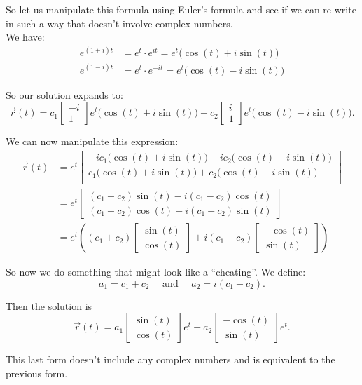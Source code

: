 \begin{example}
So let us manipulate this formula using Euler's formula and see if we can re-write in such a way that doesn't involve complex numbers. \\

We have:
\begin{align*}
	e^{(1+i)t} &= e^t \cdot e^{it} = e^t \big( \cos(t) + i \sin(t)\big) \\
	e^{(1-i)t} &= e^t \cdot e^{-it} = e^t \big( \cos(t) - i \sin(t)\big)
\end{align*}

So our solution expands to:
$$
\vec{r}(t) = c_1 \begin{bmatrix} -i \\ 1 \end{bmatrix} e^t \big( \cos(t) + i \sin(t)\big)
+c_2\begin{bmatrix} i \\ 1 \end{bmatrix} e^t \big( \cos(t) - i \sin(t)\big).
$$

We can now manipulate this expression:
\begin{align*}
\vec{r}(t) 
	& = e^t
		\begin{bmatrix}
			-i c_1 	\big( \cos(t) + i \sin(t)\big) + i c_2 \big( \cos(t) - i \sin(t)\big) \\
			c_1 	\big( \cos(t) + i \sin(t)\big) + c_2 \big( \cos(t) - i \sin(t)\big) \\
		\end{bmatrix} \\
	& = e^t 
		\begin{bmatrix}
			(c_1+c_2) \sin(t) - i (c_1-c_2) \cos(t) \\
			(c_1+c_2) \cos(t) + i(c_1-c_2) \sin(t)
		\end{bmatrix} \\
	& = e^t \left( (c_1+c_2) \begin{bmatrix} \sin(t) \\ \cos(t) \end{bmatrix}
		+ i (c_1 -c_2) \begin{bmatrix} - \cos(t) \\ \sin(t) \end{bmatrix}
		\right)
\end{align*}

So now we do something that might look like a ``cheating''. We define:
$$
a_1 = c_1+c_2 \quad \text{ and } \quad a_2 = i (c_1-c_2).
$$


Then the solution is
$$
\vec{r}(t) = a_1\begin{bmatrix} \sin(t) \\ \cos(t) \end{bmatrix} e^t
		+ a_2 \begin{bmatrix} - \cos(t) \\ \sin(t) \end{bmatrix} e^t.
$$

This last form doesn't include any complex numbers and is equivalent to the previous form.

\end{example}

